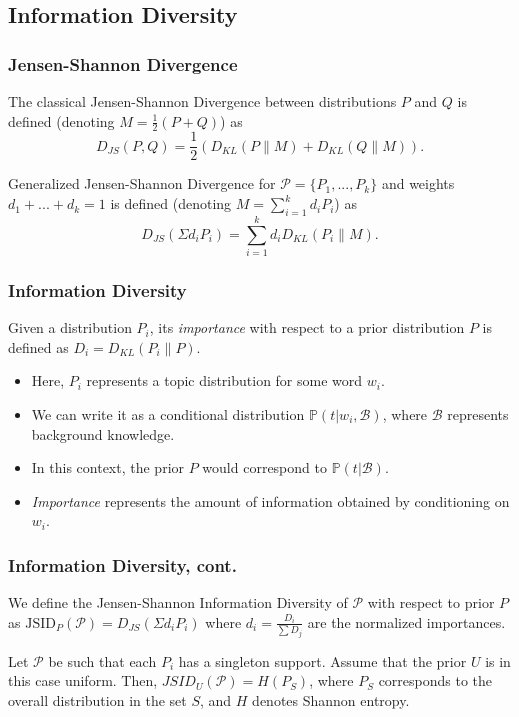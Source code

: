 \documentclass{beamer}
\newcommand\bet{\begin{Theorem}}
\newcommand\eet{\end{Theorem}}
\newcommand\bed{\begin{Definition}}
\newcommand\eed{\end{Definition}}
\newcommand\cP{{\mathcal P}}
\newcommand\cB{{\mathcal B}}
\def\pp{{\mathbb P}}
\begin{document}
\subsection{Information Diversity}

\begin{frame}
\frametitle{Jensen-Shannon Divergence}
\bed
The classical Jensen-Shannon Divergence between distributions $P$ and
$Q$ is defined (denoting $M=\frac{1}{2}(P+Q)$) as
\[D_{JS}(P,Q) = \frac{1}{2}\left(D_{KL}(P\|M)+D_{KL}(Q\|M)\right).\]
\eed
\bed
Generalized Jensen-Shannon Divergence for  $\cP=\{P_{1},...,P_{k}\}$
and weights $d_1+...+d_k=1$ is defined (denoting $M=\sum_{i=1}^k d_i
P_i$) as
\[D_{JS}(\Sigma d_iP_i) = \sum_{i=1}^k d_i D_{KL}(P_i\|M).\] 
\eed
\end{frame}

\begin{frame}
\frametitle{Information Diversity}
\bed\label{importance}
Given a distribution $P_i$, its {\sl importance} with respect to a
prior distribution $P$ is defined as $D_i = D_{KL}(P_i\|P)$.
\eed
\begin{itemize}
\item Here, $P_i$ represents a topic distribution for some word
  $w_i$. 
\item We can write it as a conditional distribution
  $\pp(t|w_i,\cB)$, where $\cB$ represents background knowledge. 
\item In this context, the prior $P$ would correspond to
  $\pp(t|\cB)$. 
\item {\em Importance} represents the amount of information obtained
  by conditioning on $w_i$.
\end{itemize}
\end{frame}

\begin{frame}
\frametitle{Information Diversity, cont.}
\bed\label{diversity}
We define the Jensen-Shannon Information Diversity of $\cP$ with
respect to prior $P$ as $\mbox{JSID}_P(\cP)=D_{JS}(\Sigma d_i P_i)$
where $d_{i}=\frac{D_{i}}{\sum D_{j}}$ are the normalized importances.
\eed
\bet\label{entropy}
Let $\cP$ be such that each $P_i$ has a singleton support. Assume that
the prior $U$ is in this case uniform. Then, 
$JSID_U(\cP)=H(P_S)$,
where $P_S$ corresponds to the overall distribution in the set
$S$, and $H$ denotes Shannon entropy.
\eet
\end{frame}
\end{document}
